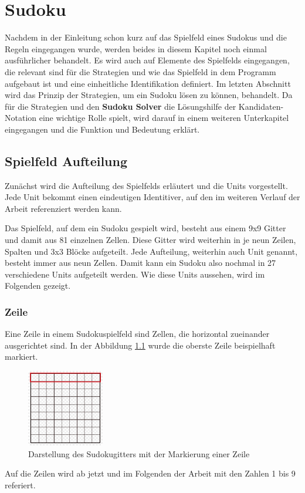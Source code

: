 

\chapter{Sudoku}
Nachdem in der Einleitung schon kurz auf das Spielfeld eines Sudokus und die Regeln eingegangen wurde, werden beides in diesem Kapitel noch einmal ausführlicher behandelt. Es wird auch auf Elemente des Spielfelds eingegangen, die relevant sind für die Strategien und wie das Spielfeld in dem Programm aufgebaut ist und eine einheitliche Identifikation definiert. Im letzten Abschnitt wird das Prinzip der Strategien, um ein Sudoku lösen zu können, behandelt. Da für die Strategien und den \textbf{Sudoku Solver} die Lösungshilfe der Kandidaten-Notation eine wichtige Rolle spielt, wird darauf in einem weiteren Unterkapitel eingegangen und die Funktion und Bedeutung erklärt.



\section{Spielfeld Aufteilung}
Zunächst wird die Aufteilung des Spielfelds erläutert und die Units vorgestellt. Jede Unit bekommt einen eindeutigen Identitiver, auf den im weiteren Verlauf der Arbeit referenziert werden kann.

Das Spielfeld, auf dem ein Sudoku gespielt wird, besteht aus einem 9x9 Gitter und damit aus 81 einzelnen Zellen. Diese Gitter wird weiterhin in je neun Zeilen, Spalten und 3x3 Blöcke aufgeteilt. Jede Aufteilung, weiterhin auch Unit genannt, besteht immer aus neun Zellen. Damit kann ein Sudoku also nochmal in 27 verschiedene Units aufgeteilt werden. Wie diese Units aussehen, wird im Folgenden gezeigt. \cite{sudopedia_2022}

\subsection{Zeile}
Eine Zeile in einem Sudokuspielfeld sind Zellen, die horizontal zueinander ausgerichtet sind. In der Abbildung \ref{fig:SudokugitterZeile} wurde die oberste Zeile beispielhaft markiert.
\begin{figure}[htbp]
	\centering
	\includegraphics[width=0.3\textwidth]{images/sudokugitterZeile.jpg}
	\caption{Darstellung des Sudokugitters mit der Markierung einer Zeile}
	\label{fig:SudokugitterZeile}
\end{figure}
Auf die Zeilen wird ab jetzt und im Folgenden der Arbeit mit den Zahlen 1 bis 9 referiert. 

